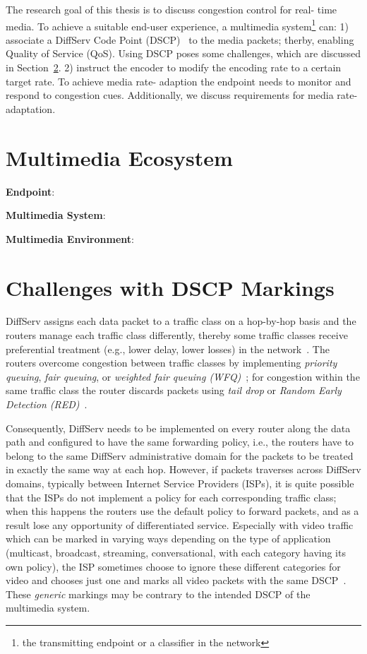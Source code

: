 
The research goal of this thesis is to discuss congestion control for real-
time media. To achieve a suitable end-user experience, a multimedia
system\footnote{the transmitting endpoint or a classifier in the network} can:
1) associate a DiffServ Code Point (DSCP)~\cite{rfc2474} to the media packets;
therby, enabling Quality of Service (QoS). Using DSCP poses some challenges,
which are discussed in Section~\ref{rg.ch.dscp}. 2) instruct the encoder to
modify the encoding rate to a certain target rate. To achieve media rate-
adaption the endpoint needs to monitor and respond to congestion cues.
Additionally, we  discuss requirements for media rate-adaptation.


\section{Multimedia Ecosystem}

\textbf{Endpoint}:

\textbf{Multimedia System}:

\textbf{Multimedia Environment}:

\section{Challenges with DSCP Markings}
\label{rg.ch.dscp}

DiffServ assigns each data packet to a traffic class on a hop-by-hop basis and
the routers manage each traffic class differently, thereby some traffic
classes receive preferential treatment (e.g., lower delay, lower losses) in
the network~\cite{rfc2475}. The routers overcome congestion between traffic
classes by implementing \emph{priority queuing}, \emph{fair queuing}, or
\emph{weighted fair queuing (WFQ)}~\cite{rfc4594}; for congestion within the
same traffic class the router discards packets using \emph{tail drop} or
\emph{Random Early Detection (RED)}~\cite{Floyd:RED}.

Consequently, DiffServ needs to be implemented on every router along the data
path and configured to have the same forwarding policy, i.e., the routers have
to belong to the same DiffServ administrative domain for the packets to be
treated in exactly the same way at each hop. However, if packets traverses
across DiffServ domains, typically between Internet Service Providers (ISPs),
it is quite possible that the ISPs do not implement a policy for each
corresponding traffic class; when this happens the routers use the default
policy to forward packets, and as a result lose any opportunity of
differentiated service. Especially with video traffic which can be marked in
varying ways depending on the type of application (multicast, broadcast,
streaming, conversational, with each category having its own policy), the ISP
sometimes choose to ignore these different categories for video and chooses
just one and marks all video packets with the same DSCP~\cite{rfc5865}. These
\emph{generic} markings may be contrary to the intended DSCP of the multimedia
system.

